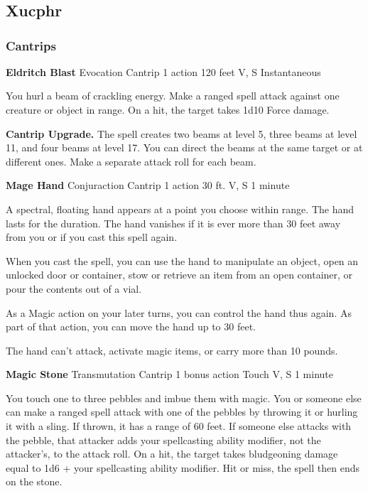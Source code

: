 \chapter*{}

\section{Xucphr}

\subsection {Cantrips}
\DndSpellHeader%
  {\textbf{Eldritch Blast}}
  {Evocation Cantrip}
  {1 action}
  {120 feet}
  {V, S}
  {Instantaneous}
  
You hurl a beam of crackling energy. Make a ranged spell attack against one creature or object in range. On a hit, the target takes 1d10 Force damage.

{\textbf{Cantrip Upgrade.}}  The spell creates two beams at level 5, three beams at level 11, and four beams at level 17. You can direct the beams at the same target or at different ones. Make a separate attack roll for each beam.


\DndSpellHeader%
{\textbf{Mage Hand}}
{Conjuraction Cantrip}
{1 action}
{30 ft.}
{V, S}
{1 minute}

A spectral, floating hand appears at a point you choose within range. The hand lasts for the duration. The hand vanishes if it is ever more than 30 feet away from you or if you cast this spell again.

When you cast the spell, you can use the hand to manipulate an object, open an unlocked door or container, stow or retrieve an item from an open container, or pour the contents out of a vial.

As a Magic action on your later turns, you can control the hand thus again. As part of that action, you can move the hand up to 30 feet.

The hand can’t attack, activate magic items, or carry more than 10 pounds.


\DndSpellHeader%
{\textbf{Magic Stone}}
{Transmutation Cantrip}
{1 bonus action}
{Touch}
{V, S}
{1 minute}

You touch one to three pebbles and imbue them with magic. You or someone else can make a ranged spell attack with one of the pebbles by throwing it or hurling it with a sling. If thrown, it has a range of 60 feet. If someone else attacks with the pebble, that attacker adds your spellcasting ability modifier, not the attacker’s, to the attack roll. On a hit, the target takes bludgeoning damage equal to 1d6 + your spellcasting ability modifier. Hit or miss, the spell then ends on the stone.

